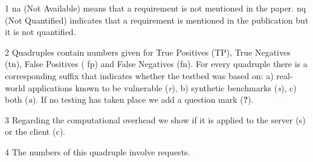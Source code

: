 \documentclass[conference]{IEEEtran}
\begin{document}
\begin{landscape}
\begin{table}
\begin{threeparttable}
\begin{small}
\begin{tablenotes}
\begin{footnotesize}
       	\item[1] {\sc na} (Not Available) means that a requirement is not mentioned in the paper.
	{\sc nq} (Not Quantified) indicates that a requirement is mentioned in the publication
	but it is not quantified.
      \item[2] Quadruples contain numbers given for True Positives
        ({\sc TP}), True Negatives ({\sc tn}), False Positives ({\sc
          fp}) and False Negatives ({\sc fn}). For every quadruple there is a corresponding suffix that indicates whether the testbed was
	based on: a) real-world applications known to be vulnerable ({\it r}), b) synthetic benchmarks ({\it s}), c) both ({\it a}).
	If no testing has taken place we add a question mark ({\bf ?}).
    \item[3] Regarding the computational overhead we show if it is applied to the server ({\sc s}) or the client ({\sc c}). 
    \item[4] The numbers of this quadruple involve requests.
	\end{footnotesize}
    \end{tablenotes}
    \end{small}
    \end{threeparttable}
\end{table}
\end{landscape}
\end{document}
